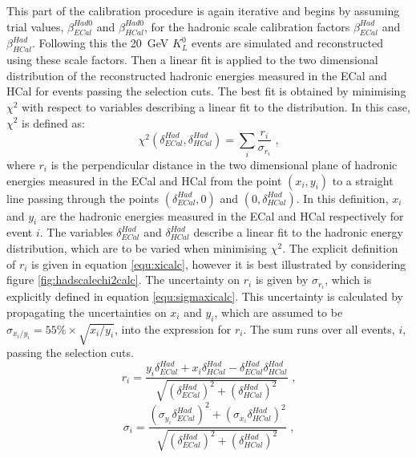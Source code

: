 This part of the calibration procedure is again iterative and begins by assuming trial values, $\beta^{Had0}_{ECal}$ and $\beta^{Had0}_{HCal}$, for the hadronic scale calibration factors $\beta^{Had}_{ECal}$ and $\beta^{Had}_{HCal}$.  Following this the 20~GeV $K^{0}_{L}$ events are simulated and reconstructed using these scale factors.  Then a linear fit is applied to the two dimensional distribution of the reconstructed hadronic energies measured in the ECal and HCal for events passing the selection cuts.  The best fit is obtained by minimising $\chi^{2}$ with respect to variables describing a linear fit to the distribution.  In this case, $\chi^{2}$ is defined as:
%
\begin{equation}
\chi^{2}(\delta^{Had}_{ECal}, \delta^{Had}_{HCal}) = \sum_{i} \frac{r_{i}}{\sigma_{r_{i}}}\text{ ,}
\end{equation}
%
\noindent where $r_{i}$ is the perpendicular distance in the two dimensional plane of hadronic energies measured in the ECal and HCal from the point $(x_{i}, y_{i})$ to a straight line passing through the points $(\delta^{Had}_{ECal}, 0)$ and $(0, \delta^{Had}_{HCal})$.  In this definition, $x_{i}$ and $y_{i}$ are the hadronic energies measured in the ECal and HCal respectively for event $i$.  The variables $\delta^{Had}_{ECal}$ and $\delta^{Had}_{HCal}$ describe a linear fit to the hadronic energy distribution, which are to be varied when minimising $\chi^{2}$.  The explicit definition of $r_{i}$ is given in equation \ref{equ:xicalc}, however it is best illustrated by considering figure \ref{fig:hadscalechi2calc}.  The uncertainty on $r_{i}$ is given by $\sigma_{r_{i}}$, which is explicitly defined in equation \ref{equ:sigmaxicalc}.  This uncertainty is calculated by propagating the uncertainties on $x_{i}$ and $y_{i}$, which are assumed to be $\sigma_{x_{i}/y_{i}} = 55\% \times \sqrt{x_{i}/y_{i}}$, into the expression for $r_{i}$.  The sum runs over all events, $i$, passing the selection cuts.  
%
\begin{equation}
r_{i} = \frac{y_{i} \delta^{Had}_{ECal} + x_{i} \delta^{Had}_{HCal} - \delta^{Had}_{ECal} \delta^{Had}_{HCal}}{\sqrt{(\delta^{Had}_{ECal})^{2} + (\delta^{Had}_{HCal})^{2}}}\text{ ,}
\label{equ:xicalc}
\end{equation}
\begin{equation}
\sigma_{i} = \frac{(\sigma_{y_{i}}  \delta^{Had}_{ECal})^{2} + (\sigma_{x_{i}} \delta^{Had}_{HCal})^{2}}{\sqrt{(\delta^{Had}_{ECal})^{2} + (\delta^{Had}_{HCal})^{2}}}\text{ ,}
\label{equ:sigmaxicalc}
\end{equation}
